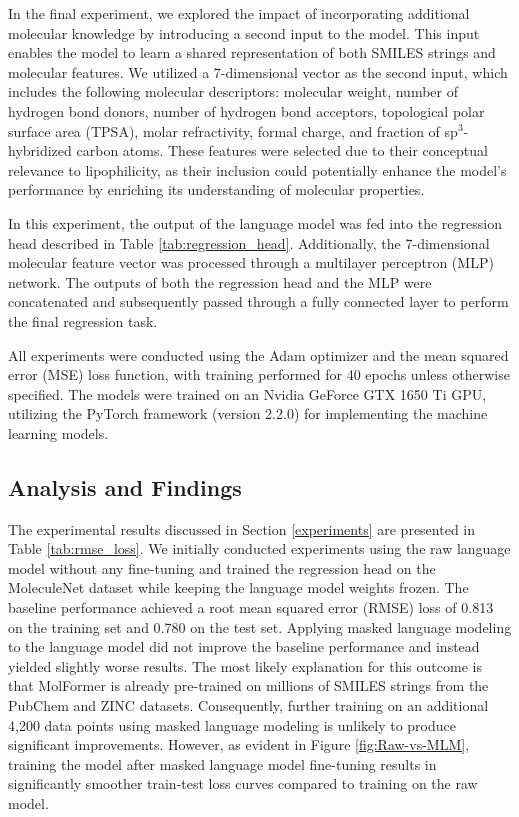 \documentclass[11pt]{article}
\begin{document}
In the final experiment, we explored the impact of incorporating additional molecular knowledge by introducing a second input to the model. This input enables the model to learn a shared representation of both SMILES strings and molecular features. We utilized a 7-dimensional vector as the second input, which includes the following molecular descriptors: molecular weight, number of hydrogen bond donors, number of hydrogen bond acceptors, topological polar surface area (TPSA), molar refractivity, formal charge, and fraction of sp$^3$-hybridized carbon atoms. These features were selected due to their conceptual relevance to lipophilicity, as their inclusion could potentially enhance the model's performance by enriching its understanding of molecular properties.

In this experiment, the output of the language model was fed into the regression head described in Table \ref{tab:regression_head}. Additionally, the 7-dimensional molecular feature vector was processed through a multilayer perceptron (MLP) network. The outputs of both the regression head and the MLP were concatenated and subsequently passed through a fully connected layer to perform the final regression task.

All experiments were conducted using the Adam optimizer and the mean squared error (MSE) loss function, with training performed for 40 epochs unless otherwise specified. The models were trained on an Nvidia GeForce GTX 1650 Ti GPU, utilizing the PyTorch framework \cite{NEURIPS2019_bdbca288} (version 2.2.0) for implementing the machine learning models.

\subsection{Analysis and Findings}
\label{analysis}
The experimental results discussed in Section \ref{experiments} are presented in Table \ref{tab:rmse_loss}. We initially conducted experiments using the raw language model without any fine-tuning and trained the regression head on the MoleculeNet dataset while keeping the language model weights frozen. The baseline performance achieved a root mean squared error (RMSE) loss of 0.813 on the training set and 0.780 on the test set. Applying masked language modeling to the language model did not improve the baseline performance and instead yielded slightly worse results. The most likely explanation for this outcome is that MolFormer is already pre-trained on millions of SMILES strings from the PubChem and ZINC datasets. Consequently, further training on an additional 4,200 data points using masked language modeling is unlikely to produce significant improvements. However, as evident in Figure \ref{fig:Raw-vs-MLM}, training the model after masked language model fine-tuning results in significantly smoother train-test loss curves compared to training on the raw model.
\end{document}
